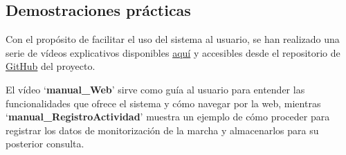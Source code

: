 \subsection{Demostraciones prácticas}
Con el propósito de facilitar el uso del sistema al usuario, se han realizado una serie de vídeos explicativos disponibles \href{https://universidaddeburgos-my.sharepoint.com/:f:/g/personal/imb1006_alu_ubu_es/EkNRdSeggjdDvwjrQTM2-HEBWiGE7iHci6z_qM_PL1FwPg?e=z8OAGu}{aquí} y accesibles desde el repositorio de \href{https://github.com/imb1006/Web_Seguimiento_Parkinson}{GitHub} del proyecto.

El vídeo `\textbf{manual\_Web}' sirve como guía al usuario para entender las funcionalidades que ofrece el sistema y cómo navegar por la web, mientras `\textbf{manual\_RegistroActividad}' muestra un ejemplo de cómo proceder para registrar los datos de monitorización de la marcha y almacenarlos para su posterior consulta.
